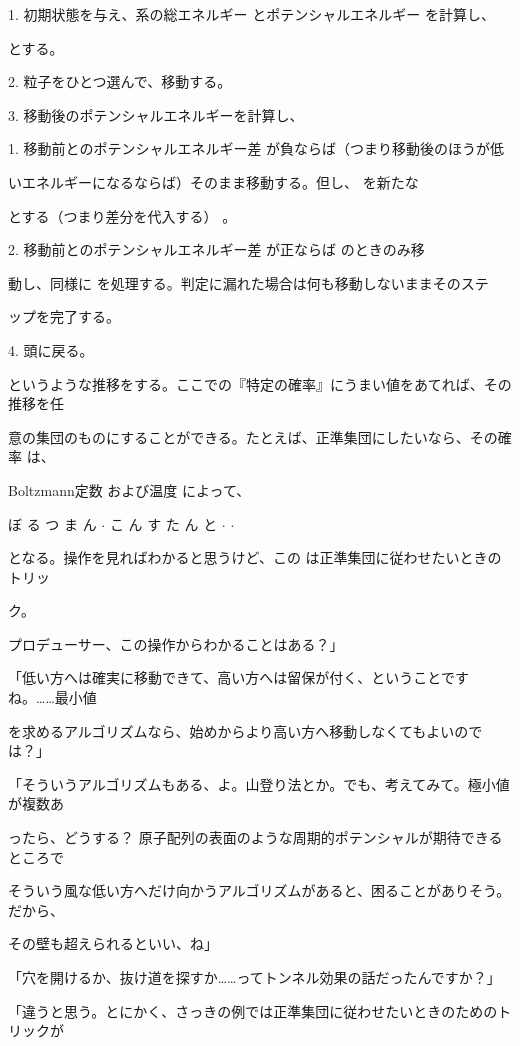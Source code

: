 1. 初期状態を与え、系の総エネルギー  とポテンシャルエネルギー  を計算し、\par
とする。\par
2. 粒⼦をひとつ選んで、移動する。\par
3. 移動後のポテンシャルエネルギーを計算し、\par
1. 移動前とのポテンシャルエネルギー差  が負ならば（つまり移動後のほうが低\par
いエネルギーになるならば）そのまま移動する。但し、  を新たな\par
とする（つまり差分を代⼊する） 。\par
2. 移動前とのポテンシャルエネルギー差  が正ならば  のときのみ移\par
動し、同様に  を処理する。判定に漏れた場合は何も移動しないままそのステ\par
ップを完了する。\par
4. 頭に戻る。\par
というような推移をする。ここでの『特定の確率』にうまい値をあてれば、その推移を任\par
意の集団のものにすることができる。たとえば、正準集団にしたいなら、その確率  は、\par
Boltzmann定数  および温度  によって、\par
ぼ る つ ま ん $\cdot$ こ ん す た ん と $\cdot$ $\cdot$\par
となる。操作を⾒ればわかると思うけど、この  は正準集団に従わせたいときのトリッ\par
ク。\par
プロデューサー、この操作からわかることはある？」\par
「低い⽅へは確実に移動できて、⾼い⽅へは留保が付く、ということですね。……最⼩値\par
を求めるアルゴリズムなら、始めからより⾼い⽅へ移動しなくてもよいのでは？」\par
「そういうアルゴリズムもある、よ。⼭登り法とか。でも、考えてみて。極⼩値が複数あ\par
ったら、どうする？ 原⼦配列の表⾯のような周期的ポテンシャルが期待できるところで\par
そういう⾵な低い⽅へだけ向かうアルゴリズムがあると、困ることがありそう。だから、\par
その壁も超えられるといい、ね」\par
「⽳を開けるか、抜け道を探すか……ってトンネル効果の話だったんですか？」\par
「違うと思う。とにかく、さっきの例では正準集団に従わせたいときのためのトリックが\par
